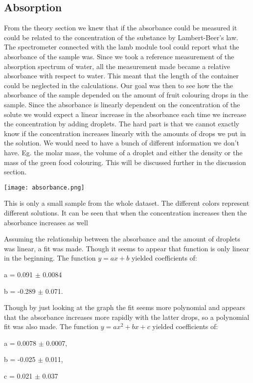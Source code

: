 \documentclass[working, oneside]{inputs/tuftebook}
\begin{document}
\subsection*{Absorption}
From the theory section we knew that if the absorbance could be measured it could be related to the concentration of the substance by Lambert-Beer's law. The spectrometer connected with the lamb module tool could report what the absorbance of the sample was. Since we took a reference measurement of the absorption spectrum of water, all the measurement made became a relative absorbance with respect to water. This meant that the length of the container could be neglected in the calculations. Our goal was then to see how the the absorbance of the sample depended on the amount of fruit colouring drops in the sample. Since the absorbance is linearly dependent on the concentration of the solute we would expect a linear increase in the absorbance each time we increase the concentration by adding droplets. The hard part is that we cannot exactly know if the concentration increases linearly with the amounts of drops we put in the solution. We would need to have a bunch of different information we don't have. Eg. the molar mass, the volume of a droplet and either the density or the mass of the green food colouring. This will be discussed further in the discussion section. \\
\begin{marginfigure}
\texttt{[image: absorbance.png]}
\caption{This is only a small sample from the whole dataset. The different colors represent different solutions. It can be seen that when the concentration increases then the absorbance increases as well}
\end{marginfigure}
Assuming the relationship between the absorbance and the amount of droplets was linear, a fit was made. Though it seems to appear that function is only linear in the beginning. The function $y = ax + b$ yielded coefficients of:
\begin{center}
a = 0.091 $\pm$ 0.0084 
\smallskip

b = -0.289 $\pm$ 0.071.
\end{center}
Though by just looking at the graph the fit seems more polynomial and appears that the absorbance increases more rapidly with the latter drops, so a polynomial fit was also made. The function $y = ax^2 + bx +c$ yielded coefficients of:
\begin{center}
a = 0.0078 $\pm$ 0.0007,
\smallskip
 
b = -0.025 $\pm$ 0.011,
\smallskip 

c = 0.021 $\pm$ 0.037
\end{center}
\end{document}
